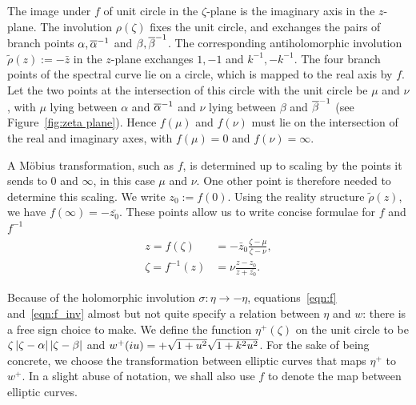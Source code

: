 \documentclass{article}
\begin{document}
The image under $f$ of unit circle in the $\zeta$-plane is the imaginary axis in the $z$-plane. The involution $\rho(\zeta)$ fixes the unit circle, and exchanges the pairs of branch points $\alpha,\overline{\alpha}^{-1}$ and $\beta,\overline{\beta}^{-1}$. The corresponding antiholomorphic involution $\tilde{\rho}(z) := -\bar{z}$ in the $z$-plane exchanges $1,-1$ and $k^{-1},-k^{-1}$. The four branch points of the spectral curve lie on a circle, which is mapped to the real axis by $f$. Let the two points at the intersection of this circle with the unit circle be $\mu$ and $\nu$, with $\mu$ lying between $\alpha$ and $\overline{\alpha}^{-1}$ and $\nu$ lying between $\beta$ and $\overline{\beta}^{-1}$ (see Figure~\ref{fig:zeta plane}). Hence $f(\mu)$ and $f(\nu)$ must lie on the intersection of the real and imaginary axes, with $f(\mu) = 0$ and $f(\nu) = \infty$.

A M\"obius transformation, such as $f$, is determined up to scaling by the points it sends to $0$ and $\infty$, in this case $\mu$ and $\nu$. One other point is therefore needed to determine this scaling. We write $z_0 := f(0)$. Using the reality structure $\tilde{\rho}(z)$, we have $f(\infty) = -\bar{z_0}$. These points allow us to write concise formulae for $f$ and $f^{-1}$
\begin{align}
z = f(\zeta) &= -\bar{z}_0 \frac{\zeta - \mu}{\zeta - \nu},
\label{eqn:f} \\
\zeta = f^{-1}(z) &= \nu \frac{z - z_0}{z + \bar{z_0}}.
\label{eqn:f_inv}
\end{align}

Because of the holomorphic involution $\sigma: \eta\to-\eta$, equations~\eqref{eqn:f} and~\eqref{eqn:f_inv} almost but not quite specify a relation between $\eta$ and $w$: there is a free sign choice to make. 
We define the function $\eta^+(\zeta)$ on the unit circle to be $\zeta\left|\zeta-\alpha\right|\left|\zeta-\beta\right|$ and $w^+(i u) = + \sqrt{1+u^2}\sqrt{1+k^2u^2}$.
For the sake of being concrete, we choose the transformation between elliptic curves that maps $\eta^+$ to $w^+$.
In a slight abuse of notation, we shall also use $f$ to denote the map between elliptic curves.
\end{document}
